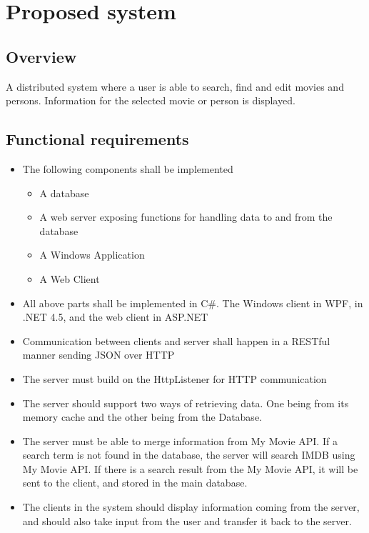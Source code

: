 \section{Proposed system}
\label{sec:proposed system}

\subsection{Overview}
A distributed system where a user is able to search, find and edit movies and persons. Information for the selected movie or person is displayed.
\subsection{Functional requirements}
\begin{itemize}
	\setlength{\itemsep}{-5pt}
	\item The following components shall be implemented
	\begin{itemize}
		\setlength{\itemsep}{-5pt}
		\item A database
		\item A web server exposing functions for handling data to and from the database
		\item A Windows Application
		\item A Web Client
	\end{itemize}
	\item All above parts shall be implemented in C\#. The Windows client in WPF, in .NET 4.5, and the web client in ASP.NET
	\item Communication between clients and server shall happen in a RESTful manner sending JSON over HTTP
	\item The server must build on the HttpListener for HTTP communication
	\item The server should support two ways of retrieving data. One being from its memory cache and the other being from the Database. 
	\item The server must be able to merge information from My Movie API. If a search term is not found in the database, the server will search IMDB using My Movie API. If there is a search result from the My Movie API, it will be sent to the client, and stored in the main database.
	\item The clients in the system should display information coming from the server, and should also take input from the user and transfer it back to the server.
\end{itemize}

